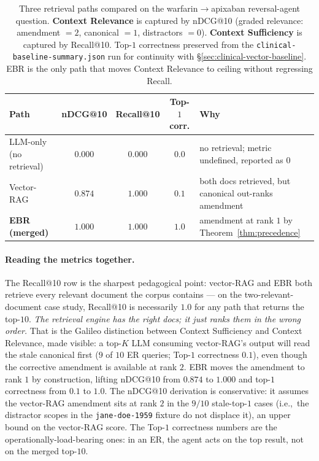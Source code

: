 \documentclass[runningheads]{llncs}
\begin{document}
\begin{table}[h]
\centering
\caption{Three retrieval paths compared on the warfarin$\rightarrow$apixaban
         reversal-agent question. \textbf{Context Relevance} is captured by
         nDCG@10 (graded relevance: amendment $=2$, canonical $=1$,
         distractors $=0$). \textbf{Context Sufficiency} is captured by
         Recall@10. Top-$1$ correctness preserved from the
         \texttt{clinical-baseline-summary.json} run for continuity with
         \S\ref{sec:clinical-vector-baseline}. EBR is the only path that
         moves Context Relevance to ceiling without regressing Recall.}
\label{tab:clinical-three-path}
\small
\begin{tabular}{lcccl}
\toprule
\textbf{Path} & \textbf{nDCG@10} & \textbf{Recall@10} & \textbf{Top-$1$ corr.} & \textbf{Why} \\
\midrule
LLM-only (no retrieval) & $0.000$ & $0.000$ & $0.0$ & no retrieval; metric undefined, reported as $0$ \\
Vector-RAG              & $0.874$ & $1.000$ & $0.1$ & both docs retrieved, but canonical out-ranks amendment \\
\textbf{EBR (merged)}   & $\mathbf{1.000}$ & $\mathbf{1.000}$ & $\mathbf{1.0}$ & amendment at rank $1$ by Theorem~\ref{thm:precedence} \\
\bottomrule
\end{tabular}
\end{table}

\paragraph{Reading the metrics together.} The Recall@10 row is the
sharpest pedagogical point: vector-RAG and EBR both retrieve every
relevant document the corpus contains --- on the two-relevant-document
case study, Recall@10 is necessarily $1.0$ for any path that returns
the top-$10$. \emph{The retrieval engine has the right docs; it just
ranks them in the wrong order.} That is the Galileo distinction
between Context Sufficiency and Context Relevance, made visible: a
top-$K$ LLM consuming vector-RAG's output will read the stale
canonical first ($9$ of $10$ ER queries; Top-$1$ correctness $0.1$),
even though the corrective amendment is available at rank $2$. EBR
moves the amendment to rank $1$ by construction, lifting nDCG@10 from
$0.874$ to $1.000$ and top-$1$ correctness from $0.1$ to $1.0$. The
nDCG@10 derivation is conservative: it assumes the vector-RAG amendment
sits at rank $2$ in the $9/10$ stale-top-$1$ cases (i.e.,~the
distractor scopes in the
\texttt{jane-doe-1959} fixture do not displace it), an upper bound on
the vector-RAG score. The Top-$1$ correctness numbers are the
operationally-load-bearing ones: in an ER, the agent acts on the top
result, not on the merged top-$10$.
\end{document}
